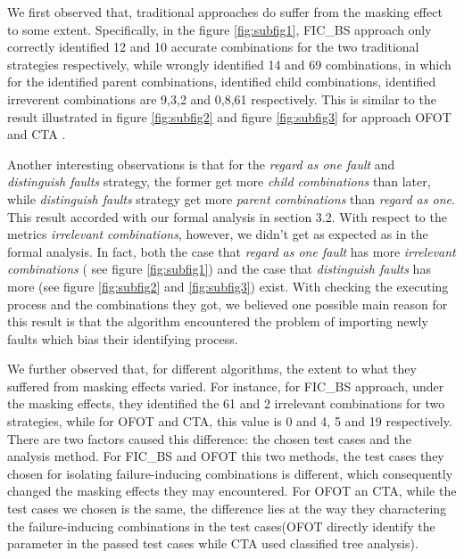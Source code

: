 \documentclass{sig-alternate}
\begin{document}
We first observed that, traditional approaches do suffer from the masking effect to some extent. Specifically, in the figure \ref{fig:subfig1}, FIC\_BS approach only correctly identified 12 and 10 accurate combinations for the two traditional strategies respectively, while wrongly identified 14 and 69 combinations, in which for the identified parent combinations, identified child combinations, identified irreverent combinations are 9,3,2 and 0,8,61 respectively. This is similar to the result illustrated in figure \ref{fig:subfig2} and figure \ref{fig:subfig3} for approach OFOT and CTA .

Another interesting observations is that for the \emph{regard as one fault} and \emph{distinguish faults} strategy, the former get more \emph{child combinations} than later, while \emph{distinguish faults} strategy get more \emph{parent combinations} than \emph{regard as one}. This result accorded with our formal analysis in section 3.2. With respect to the metrics \emph{irrelevant combinations}, however, we didn't get as expected as in the formal analysis. In fact, both the case that \emph{regard as one fault} has more \emph{irrelevant combinations} ( see figure \ref{fig:subfig1}) and the case that \emph{distinguish faults} has more (see figure \ref{fig:subfig2} and \ref{fig:subfig3}) exist. With checking the executing process and the combinations they got, we believed one possible main reason for this result is that the algorithm encountered the problem of importing newly faults which bias their identifying process.


We further observed that, for different algorithms, the extent to what they suffered from masking effects varied. For instance, for FIC\_BS approach, under the masking effects, they  identified the 61 and 2 irrelevant combinations for two strategies, while for OFOT and CTA, this value is 0 and 4, 5 and 19 respectively. There are two factors caused this difference: the chosen test cases and the analysis method. For FIC\_BS and OFOT this two methods, the test cases they chosen for isolating failure-inducing combinations is different, which consequently changed the masking effects they may encountered. For OFOT an CTA, while the test cases we chosen is the same, the difference lies at the way they charactering the failure-inducing combinations in the test cases(OFOT directly identify the parameter in the passed test cases while CTA used classified tree analysis).
\end{document}
